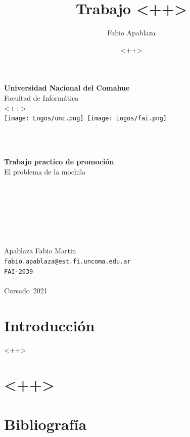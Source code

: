 \documentclass{article}
\title{Trabajo <++>}
\author{Fabio Apablaza}
\begin{document}
\titlepage
\date{<++>} %
\Large
\begin{center}


\vspace{0.7cm}
{\LARGE {\bf Universidad Nacional del Comahue}}\\
{\Large { Facultad de Informática}}\\
{\large {<++>}}\\%

\vspace{-3cm}
\mbox{\hspace{-3.5cm}\texttt{[image: Logos/unc.png]}\hspace{14cm}
\texttt{[image: Logos/fai.png]}}



\vspace{2cm}



\ \\
{

	\ \\
	\textbf{Trabajo practico de promoción}\\
	El problema de la mochila	
	\ \\

\ \\
\ \\

\ \\

\ \\

\ \\

\ \\

\ \\
\vfill
{\Large Apablaza Fabio Martin
\ \\
\texttt{fabio.apablaza@est.fi.uncoma.edu.ar}
\ \\
\texttt{FAI-2039}
}
\ \\
\ \\
{\LARGE Cursado\ 2021}
\ \\
}
\end{center}
\normalsize
\newpage
\tableofcontents

\newpage
\section{Introducción}
<++>

\section{<++>}
\newpage
\section{Bibliografía}


\end{document}
